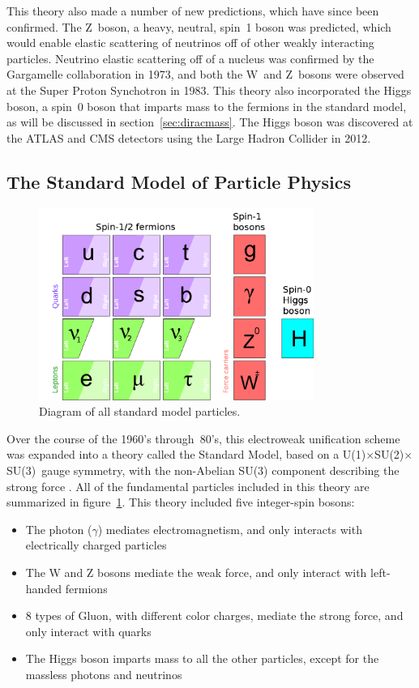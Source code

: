 \documentclass[/main.tex]{subfiles}
\begin{document}
This theory also made a number of new predictions, which have since been confirmed.
The Z~boson, a heavy, neutral, spin~1 boson was predicted, which would enable elastic scattering of neutrinos off of other weakly interacting particles.
Neutrino elastic scattering off of a nucleus was confirmed by the Gargamelle collaboration in 1973\cite{Gargamelle1973}, and both the W~and Z~bosons were observed at the Super Proton Synchotron in 1983\cite{Arnison1983, Bagnaia1983}.
This theory also incorporated the Higgs boson, a spin~0 boson that imparts mass to the fermions in the standard model, as will be discussed in section~\ref{sec:diracmass}.
The Higgs boson was discovered at the ATLAS and CMS detectors using the Large Hadron Collider in 2012\cite{ATLAS2012, CMS2012}.

\subsection{The Standard Model of Particle Physics} \label{sec:SM}
\begin{figure}[t]
  \centering
  \includegraphics[width=0.8\textwidth]{SM}
  \caption[Standard Model Particles]{\label{fig:SM}
    Diagram of all standard model particles.
  }
\end{figure}
Over the course of the 1960's through~80's, this electroweak unification scheme was expanded into a theory called the Standard Model, based on a U(1)$\times$SU(2)$\times$SU(3)~gauge symmetry, with the non-Abelian SU(3) component describing the strong force \cite{PDG2018}.
All of the fundamental particles included in this theory are summarized in figure~\ref{fig:SM}.
This theory included five integer-spin bosons:
\begin{itemize}
\item The photon ($\gamma$) mediates electromagnetism, and only interacts with electrically charged particles
\item The W and Z bosons mediate the weak force, and only interact with left-handed fermions
\item 8 types of Gluon, with different color charges, mediate the strong force, and only interact with quarks
\item The Higgs boson imparts mass to all the other particles, except for the massless photons and neutrinos
\end{itemize}
\end{document}
